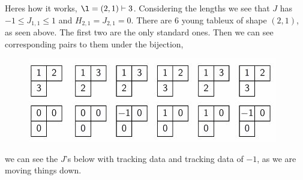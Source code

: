 \documentclass{article}
\begin{document}
Heres how it works, $\l = (2, 1) \vdash 3$. Considering the lengths we see that $J$ has $-1 \le J_{1, 1} \le 1$ and $H_{2, 1} = J_{2,1} = 0$. There are 6 young tableux of shape $(2, 1)$, as seen above. The first two are the only standard ones. Then we can see corresponding pairs to them under the bijection,

\begin{figure}[!ht]
  \centering
  \includegraphics{./figures/L3.6}
\end{figure}
we can see the $J$'s below with tracking data and tracking data of $-1$, as we are moving things down.
\end{document}
